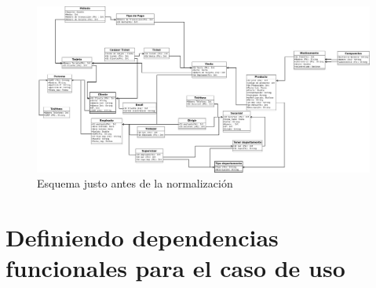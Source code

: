 \documentclass[10pt]{article}
\begin{document}
\begin{figure}[H]
	\centering
	\includegraphics[scale=0.2 ]{practica07.jpeg}
	\caption{Esquema justo antes de la normalización}
	\label{fg:esNN}
\end{figure}

\section{Definiendo dependencias funcionales para el caso de uso}
\end{document}
